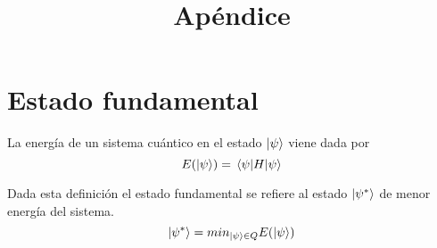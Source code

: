 \documentclass{article}
\title{Apéndice}
\begin{document}
\maketitle{}

\section{Estado fundamental}
\label{sec:apendice-estado_fundamental}
La energía de un sistema cuántico en el estado \( \ket{\psi} \) viene dada por \[ E(\ket{\psi}) = \expval{H}{\psi} \]

Dada esta definición el estado fundamental se refiere al estado \(\ket{\psi^*}\) de menor energía del sistema.
  \[ \ket{\psi^*} = min_{\ket{\psi} \in Q} E(\ket{\psi}) \]
\end{document}
